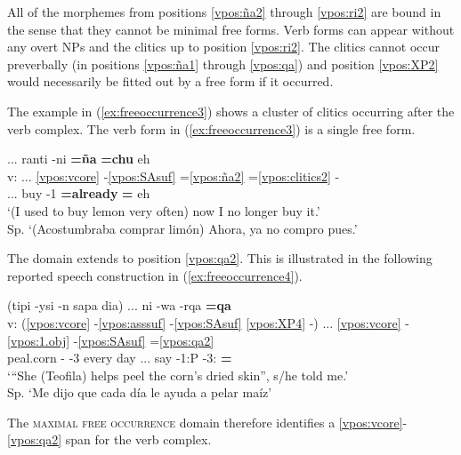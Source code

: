 \documentclass[output=paper]{langscibook}
\begin{document}
All of the morphemes from positions \ref{vpos:ña2} through \ref{vpos:ri2} are bound in the sense that they cannot be minimal free forms. Verb forms can appear without any overt NPs and the clitics up to position \ref{vpos:ri2}. The clitics cannot occur preverbally (in positions \ref{vpos:ña1} through \ref{vpos:qa}) and position \ref{vpos:XP2} would necessarily be fitted out by a free form if it occurred. 

The example in (\ref{ex:freeoccurrence3}) shows a cluster of clitics occurring after the verb complex. The verb form in (\ref{ex:freeoccurrence3}) is a single free form.

\ea \label{ex:freeoccurrence3}
	\glll {}  ... ranti -ni \textbf{=ña} \textbf{=chu} eh  \\
    v: ... \ref{vpos:vcore} -\ref{vpos:SAsuf} =\ref{vpos:ña2} =\ref{vpos:clitics2} -     \\
     {} ... buy -1\Sg{} \textbf{=already} \textbf{=\Neg{}} eh  \\
	\glt `(I used to buy lemon very often) now I no longer buy it.' \\ Sp. `(Acostumbraba comprar limón) Ahora, ya no compro pues.' \hfill 
\z


The domain extends to position \ref{vpos:qa2}. This is illustrated in the following reported speech construction in (\ref{ex:freeoccurrence4}). 

\ea \label{ex:freeoccurrence4}
	\glll {} (tipi -ysi -n sapa dia) ... ni -wa -rqa \textbf{=qa}   \\
    v: (\ref{vpos:vcore} -\ref{vpos:asssuf} -\ref{vpos:SAsuf} \ref{vpos:XP4} -) ... \ref{vpos:vcore} -\ref{vpos:1.obj} -\ref{vpos:SAsuf} =\ref{vpos:qa2} \\
    {} peal.corn -\Assist{} -3\Sg{} every day ... say -1\Sg{}:P -3\Sg{}:\Pst{} \textbf{=\Top{}}	\\
	\glt `“She (Teofila) helps  peel the corn's dried skin”, s/he told me.' \\ Sp. `Me dijo que cada día le ayuda a pelar maíz' 
\z

The \textsc{maximal free occurrence} domain therefore identifies a \ref{vpos:vcore}-\ref{vpos:qa2} span for the verb complex.
\end{document}
